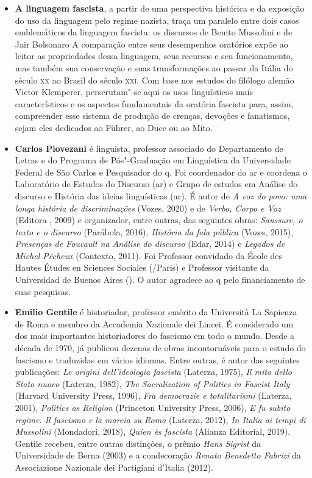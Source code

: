 \begin{itemize}


\item \textbf{A linguagem fascista}, a partir de uma perspectiva histórica e da exposição do uso da linguagem pelo regime nazista, traça um paralelo entre dois casos emblemáticos da linguagem fascista: os discursos de Benito Mussolini e de Jair Bolsonaro A comparação entre seus desempenhos oratórios expõe ao leitor as propriedades dessa linguagem, seus recursos e seu funcionamento, mas também sua conservação e suas transformações ao passar da Itália do século \textsc{xx} ao Brasil do século \textsc{xxi}. Com base nos estudos do filólogo alemão Victor Klemperer, perscrutam"-se aqui os usos linguísticos mais característicos e os aspectos fundamentais da oratória fascista para, assim, compreender esse sistema de produção de crenças, devoções e fanatismos, sejam eles dedicados ao Führer, ao Duce ou ao Mito.
  
\item \textbf{Carlos Piovezani} é linguista, professor associado do
Departamento de Letras e do Programa de Pós"-Graduação em Linguística da
Universidade Federal de São Carlos e Pesquisador do q. Foi
coordenador do ar e coordena o Laboratório de Estudos do
Discurso (ar) e Grupo de estudos em Análise do
discurso e História das ideias linguísticas (ar). É
autor de \emph{A voz do povo: uma longa história de discriminações}
(Vozes, 2020) e de \emph{Verbo, Corpo e Voz} (Editora , 2009) e
organizador, entre outras, das seguintes obras: \emph{Saussure, o texto
e o discurso} (Parábola, 2016), \emph{História da fala pública} (Vozes,
2015), \emph{Presenças de Foucault na Análise do discurso} (Edar,
2014) e \emph{Legados de Michel Pêcheux} (Contexto, 2011). Foi Professor
convidado da École des Hautes Études en Sciences Sociales (/Paris)
e Professor visitante da Universidad de Buenos Aires (). O autor
agradece ao q pelo financiamento de suas pesquisas.

\item \textbf{Emilio Gentile} é historiador, professor emérito da Università
La Sapienza de Roma e membro da Accademia Nazionale dei Lincei. É
considerado um dos mais importantes historiadores do fascismo em todo o
mundo. Desde a década de 1970, já publicou dezenas de obras
incontornáveis para o estudo do fascismo e traduzidas em vários idiomas.
Entre outras, é autor das seguintes publicações: \emph{Le origini
dell'ideologia fascista} (Laterza, 1975), \emph{Il mito dello Stato
nuovo} (Laterza, 1982), \emph{The Sacralization of Politics in Fascist
Italy} (Harvard University Press, 1996), \emph{Fra democrazie e
totalitarismi} (Laterza, 2001), \emph{Politics as Religion} (Princeton
University Press, 2006), \emph{E fu subito regime. Il fascismo e la
marcia su Roma} (Laterza, 2012), \emph{In Italia ai tempi di Mussolini}
(Mondadori, 2018), \emph{Quien ès fascista} (Alianza Editorial, 2019).
Gentile recebeu, entre outras distinções, o prêmio \emph{Hans Sigrist}
da Universidade de Berna (2003) e a condecoração \emph{Renato Benedetto
Fabrizi} da Associazione Nazionale dei Partigiani d'Italia (2012).

\end{itemize}

